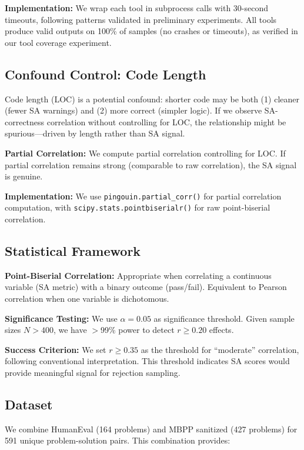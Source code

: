 \textbf{Implementation:} We wrap each tool in subprocess calls with 30-second timeouts, following patterns validated in preliminary experiments. All tools produce valid outputs on 100\% of samples (no crashes or timeouts), as verified in our tool coverage experiment.

\subsection{Confound Control: Code Length}

Code length (LOC) is a potential confound: shorter code may be both (1) cleaner (fewer SA warnings) and (2) more correct (simpler logic). If we observe SA-correctness correlation without controlling for LOC, the relationship might be spurious---driven by length rather than SA signal.

\textbf{Partial Correlation:} We compute partial correlation controlling for LOC. If partial correlation remains strong (comparable to raw correlation), the SA signal is genuine.

\textbf{Implementation:} We use \texttt{pingouin.partial\_corr()} for partial correlation computation, with \texttt{scipy.stats.pointbiserialr()} for raw point-biserial correlation.

\subsection{Statistical Framework}

\textbf{Point-Biserial Correlation:} Appropriate when correlating a continuous variable (SA metric) with a binary outcome (pass/fail). Equivalent to Pearson correlation when one variable is dichotomous.

\textbf{Significance Testing:} We use $\alpha=0.05$ as significance threshold. Given sample sizes $N>400$, we have $>$99\% power to detect $r\geq0.20$ effects.

\textbf{Success Criterion:} We set $r\geq0.35$ as the threshold for ``moderate'' correlation, following conventional interpretation. This threshold indicates SA scores would provide meaningful signal for rejection sampling.

\subsection{Dataset}

We combine HumanEval (164 problems) and MBPP sanitized (427 problems) for 591 unique problem-solution pairs. This combination provides:

